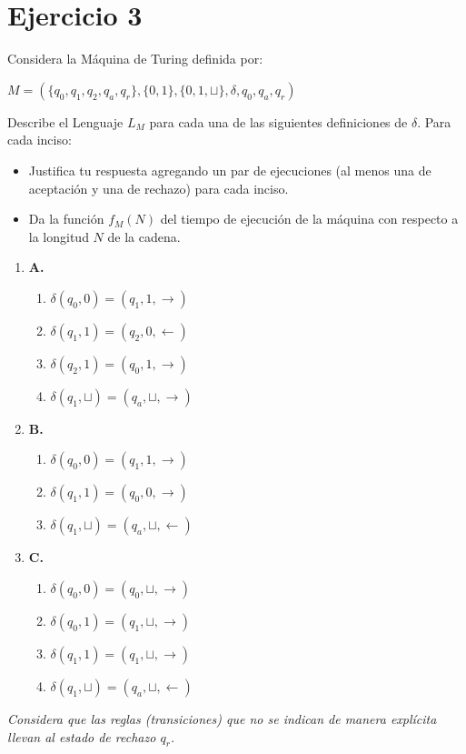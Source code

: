 \section{Ejercicio 3}

\begin{tcolorbox}[enunciado]
Considera la Máquina de Turing definida por:
\begin{center}
    $M=(\{ q_0,q_1,q_2,q_a,q_r \}, \{ 0,1\}, \{ 0,1, \sqcup\}, \delta, q_0,q_a,q_r)$
\end{center}
Describe el Lenguaje $L_M$ para cada una de las siguientes definiciones de $\delta$. Para cada inciso:
\begin{itemize}[leftmargin=*]
    \item Justifica tu respuesta agregando un par de ejecuciones (al menos una de aceptación y una de rechazo) para cada inciso.
    \item Da la función $f_M(N)$ del tiempo de ejecución de la máquina con respecto a la longitud $N$ de la cadena.
\end{itemize}

\begin{enumerate} 
\item \textbf{A.}
\begin{enumerate}
    \item $\delta(q_0,0) = (q_1,1,\rightarrow)$
    \item $\delta(q_1,1) = (q_2,0,\leftarrow)$
    \item $\delta(q_2,1) = (q_0,1,\rightarrow)$
    \item $\delta(q_1,\sqcup) = (q_a,\sqcup,\rightarrow)$
\end{enumerate}

\item \textbf{B.}
\begin{enumerate}
    \item $\delta(q_0,0) = (q_1, 1, \rightarrow)$
    \item $\delta(q_1,1) = (q_0,0,\rightarrow)$
    \item $\delta(q_1,\sqcup) = (q_a,\sqcup,\leftarrow)$
\end{enumerate}

\item \textbf{C.}
\begin{enumerate}
    \item $\delta(q_0,0) = (q_0,\sqcup,\rightarrow)$
    \item $\delta(q_0,1) = (q_1,\sqcup,\rightarrow)$
    \item $\delta(q_1,1) = (q_1,\sqcup,\rightarrow)$
    \item $\delta(q_1,\sqcup) = (q_a,\sqcup,\leftarrow)$
\end{enumerate}
\end{enumerate}
\textit{Considera que las reglas (transiciones) que no se indican de manera explícita llevan al estado de rechazo $q_r$.}
\end{tcolorbox}

